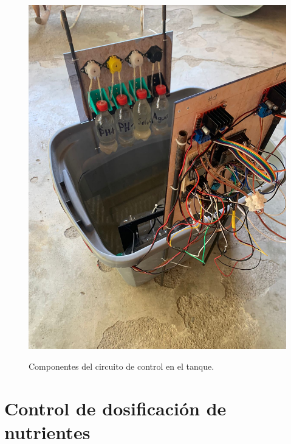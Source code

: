 \begin{figure}[H]
\centering
         \includegraphics[scale=0.15]{imgs/circuitoCompleto.jpg} \\
    \caption{Componentes del circuito de control en el tanque. }\label{completo}
\end{figure}

\section{Control de dosificación de nutrientes}
